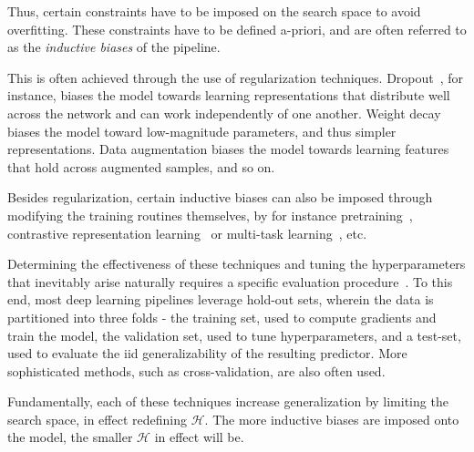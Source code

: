 	Thus, certain constraints have to be imposed on the search space to avoid overfitting. These constraints have to be defined a-priori, and are often referred to as the \textit{ inductive biases} of the pipeline. 

	This is often achieved through the use of regularization techniques. Dropout~\cite{dropout}, for instance, biases the model towards learning representations that distribute well across the network and can work independently of one another. Weight decay~\cite{weight_decay} biases the model toward low-magnitude parameters, and thus simpler representations. Data augmentation biases the model towards learning features that hold across augmented samples, and so on.

	Besides regularization, certain inductive biases can also be imposed through modifying the training routines themselves, by for instance pretraining~\cite{pretrain}, contrastive representation learning~\cite{contrastive} or multi-task learning~\cite{ddanet, multitask}, etc.

	Determining the effectiveness of these techniques and tuning the hyperparameters that inevitably arise naturally requires a specific evaluation procedure~\cite{deep_learning_book}. To this end, most deep learning pipelines leverage hold-out sets, wherein the data is partitioned into three folds - the training set, used to compute gradients and train the model, the validation set, used to tune hyperparameters, and a test-set, used to evaluate the \gls{iid} generalizability of the resulting predictor. More sophisticated methods, such as cross-validation, are also often used. 

	Fundamentally, each of these techniques increase generalization by limiting the search space, in effect redefining \(\mathcal{H}\). The more inductive biases are imposed onto the model, the smaller \(\mathcal{H}\) in effect will be. 

